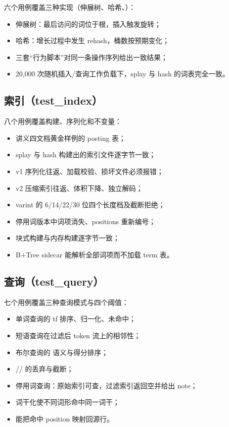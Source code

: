 六个用例覆盖三种实现（伸展树、哈希、）：

\begin{itemize}
  \item 伸展树：最后访问的词位于根，插入触发旋转；
  \item 哈希：增长过程中发生 rehash，桶数按预期变化；
  \item 三套“行为脚本”对同一条操作序列给出一致结果；
  \item 20,000 次随机插入/查询工作负载下，splay 与 hash 的词表完全一致。
\end{itemize}

\subsection{索引（test\_index）}

八个用例覆盖构建、序列化和不变量：

\begin{itemize}
  \item 讲义四文档黄金样例的 posting 表；
  \item splay 与 hash 构建出的索引文件逐字节一致；
  \item v1 序列化往返、加载校验、损坏文件必须报错；
  \item v2 压缩索引往返、体积下降、独立解码；
  \item varint 的 6/14/22/30 位四个长度档及截断拒绝；
  \item 停用词版本中词项消失、positions 重新编号；
  \item 块式构建与内存构建逐字节一致；
  \item B+Tree sidecar 能解析全部词项而不加载 term 表。
\end{itemize}

\subsection{查询（test\_query）}

七个用例覆盖三种查询模式与四个阈值：

\begin{itemize}
  \item 单词查询的 tf 排序、归一化、未命中；
  \item 短语查询在过滤后 token 流上的相邻性；
  \item 布尔查询的  语义与得分排序；
  \item {}// 的丢弃与截断；
  \item 停用词查询：原始索引可查，过滤索引返回空并给出 note；
  \item 词干化使不同词形命中同一词干；
  \item {} 能把命中 position 映射回源行。
\end{itemize}

